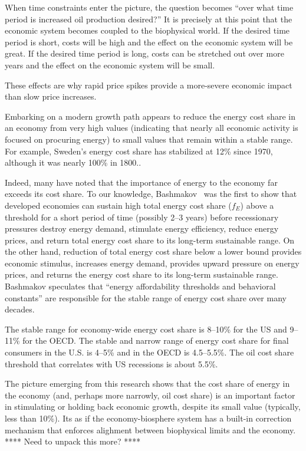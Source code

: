When time constraints enter the picture, 
the question becomes
``over what time period is increased oil production desired?''
It is precisely at this point that the economic system becomes coupled 
to the biophysical world.
If the desired time period is short, costs will be high and the effect
on the economic system will be great.
If the desired time period is long, costs can be stretched out over more years
and the effect on the economic system will be small.

These effects are why rapid price spikes provide a more-severe economic impact
than slow price increases.






Embarking on a modern growth path
appears to reduce the energy cost share in an economy from very high values
(indicating that nearly all economic activity is focused on procuring energy)
to small values that remain within a stable range.
For example, Sweden's energy cost share has stabilized at 12\% since 1970,
although it was nearly 100\% in 1800.\cite{Stern:2012ey}.

Indeed, many have noted that the importance of energy to the economy 
far exceeds its cost share.\cite{Ayres:2013aa}
To our knowledge, 
Bashmakov~\cite{Bashmakov:2007ek} was the first to show that developed economies 
can sustain high total energy cost share ($f_E$) 
above a threshold for a short period of time 
(possibly 2--3 years) before recessionary pressures destroy energy demand, 
stimulate energy efficiency, 
reduce energy prices, 
and return total energy cost share to its long-term sustainable range. 
On the other hand, reduction of total energy cost share below 
a lower bound provides economic stimulus, 
increases energy demand, 
provides upward pressure on energy prices, 
and returns the energy cost share to its long-term sustainable range.
Bashmakov speculates that 
``energy affordability thresholds and behavioral constants'' 
are responsible for the stable range of energy cost share 
over many decades.\cite[p.~3585]{Bashmakov:2007ek} 
 
The stable range for economy-wide energy cost share 
is 8--10\% for the US and 9--11\% for the OECD. 
The stable and narrow range of energy cost share 
for final consumers in the U.S. is 4--5\% and in the OECD is 4.5--5.5\%.
The oil cost share threshold that correlates with US recessions 
is about 5.5\%.\cite{Murphy:2011jh}

The picture emerging from this research shows that 
the cost share of energy in the economy
(and, perhaps more narrowly, oil cost share)
is an important factor in stimulating or holding back economic growth,
despite its small value (typically, less than 10\%). 
Its as if the economy-biosphere system has a built-in correction mechanism that 
enforces alighment between biophysical limits and the economy.
**** Need to unpack this more? ****










